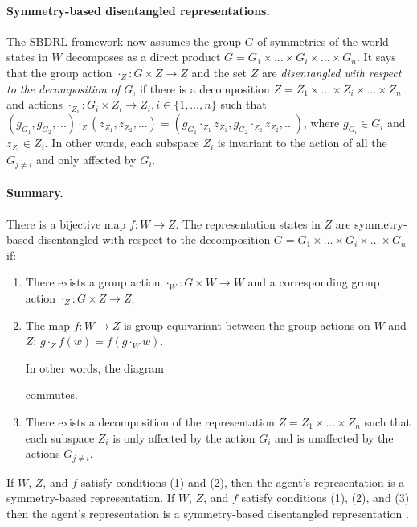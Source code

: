 \paragraph{Symmetry-based disentangled representations.}
The SBDRL framework now assumes the group $G$ of symmetries of the world states in $W$ decomposes as a direct product $G = G_1 \times \hdots \times G_i \times \hdots \times G_n$.
It says that the group action $\cdot_Z : G \times Z \to Z$ and the set $Z$ are \emph{disentangled with respect to the decomposition of $G$}, if there is a decomposition $Z = Z_1 \times \hdots \times Z_i \times \hdots \times Z_n$ and actions $\cdot_{Z_i}: G_i \times Z_i \to Z_i, i \in \{1, \hdots, n\}$ such that $(g_{G_1}, g_{G_2},...) \cdot_Z (z_{Z_1}, z_{Z_2},...) = (g_{G_1} \cdot_{Z_1} z_{Z_1}, g_{G_2} \cdot_{Z_2} z_{Z_2},...)$, where $g_{G_i} \in G_i$ and $z_{Z_i} \in Z_i$.
In other words, each subspace $Z_i$ is invariant to the action of all the $G_{j \neq i}$ and only affected by $G_i$.

\paragraph{Summary.}
There is a bijective map $f: W \to Z$.
The representation states in $Z$ are symmetry-based disentangled with respect to the decomposition $G = G_1 \times \hdots \times G_i \times \hdots \times G_n$ if:
\begin{enumerate}[(1)]
	\item There exists a group action $\cdot_{W}: G \times W \to W$ and a corresponding group action $\cdot_{Z}: G \times Z \to Z$;
	\item The map $f : W \to Z$ is group-equivariant between the group actions on $W$ and $Z$: $g \cdot_{Z} f(w) = f(g \cdot_{W} w)$.

	      In other words, the diagram
	      
	      commutes.

	\item There exists a decomposition of the representation $Z = Z_1 \times \hdots \times Z_n$ such that each subspace $Z_i$ is only affected by the action $G_i$ and is unaffected by the actions $G_{j \neq i}$.
\end{enumerate}

If $W$, $Z$, and $f$ satisfy conditions (1) and (2), then the agent's representation is a symmetry-based representation.
If $W$, $Z$, and $f$ satisfy conditions (1), (2), and (3) then the agent's representation is a symmetry-based disentangled representation \autocite{caselles2019symmetry}.

